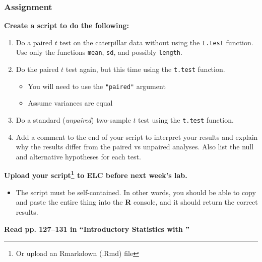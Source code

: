 \documentclass[color=usenames,dvipsnames]{beamer}\usepackage[]{graphicx}\usepackage[]{color}
\newcommand{\inr}[1]{\colorbox{inlinecolor}{\texttt{#1}}}
\begin{document}
\begin{frame}
  \frametitle{Assignment}
  \footnotesize
  {\bf Create a script to do the following:}
  \begin{enumerate}[\bf (1)]
    \item Do a paired $t$ test on the caterpillar data without using the \inr{t.test}
      function. Use only the functions \inr{mean}, \inr{sd}, and
      possibly \inr{length}.
    \item Do the paired $t$ test again, but this time using the 
      \inr{t.test} function.
      \begin{itemize}
        \scriptsize
        \item You will need to use the \texttt{"paired"} argument %
        \item Assume variances are equal
      \end{itemize}
    \item Do a standard ({\it unpaired}) two-sample $t$ test using
      the \inr{t.test} function.
    \item Add a comment to the end of your script to interpret your
      results and explain why the results differ from the paired vs
      unpaired analyses. Also list the null and alternative hypotheses for
      each test. %
  \end{enumerate}
  \vfill
  {\bf Upload your script\footnote{\scriptsize Or upload an Rmarkdown
      (.Rmd) file} to ELC before next week's lab.}
  \begin{itemize}
    \item The script must be self-contained. In other words, you
      should be able to copy and paste the entire thing into the {\bf
        R} console, and it should return the correct results.
  \end{itemize}
  \vfill
   {\bf Read pp. 127--131 in ``Introductory Statistics with \R''}
\end{frame}
\end{document}
